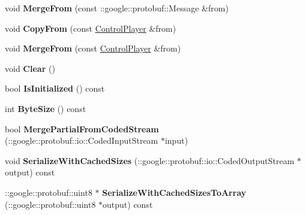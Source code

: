 \begin{DoxyCompactItemize}
\item 
\hypertarget{class_control_player_ae2e6bf23c72d1c1fafdb4069a0c85616}{void {\bfseries Merge\-From} (const \-::google\-::protobuf\-::\-Message \&from)}\label{class_control_player_ae2e6bf23c72d1c1fafdb4069a0c85616}

\item 
\hypertarget{class_control_player_a3c2ca9aebf93722e016221c52b733e3b}{void {\bfseries Copy\-From} (const \hyperlink{class_control_player}{Control\-Player} \&from)}\label{class_control_player_a3c2ca9aebf93722e016221c52b733e3b}

\item 
\hypertarget{class_control_player_a7c875ed4b63747d865fb668b50ef7b50}{void {\bfseries Merge\-From} (const \hyperlink{class_control_player}{Control\-Player} \&from)}\label{class_control_player_a7c875ed4b63747d865fb668b50ef7b50}

\item 
\hypertarget{class_control_player_a691b54dd8fd3532aa7cb76b84ed85cd5}{void {\bfseries Clear} ()}\label{class_control_player_a691b54dd8fd3532aa7cb76b84ed85cd5}

\item 
\hypertarget{class_control_player_af517c65f7b59b1c11135d462d3df655c}{bool {\bfseries Is\-Initialized} () const }\label{class_control_player_af517c65f7b59b1c11135d462d3df655c}

\item 
\hypertarget{class_control_player_a67b9268037ffaa3b2403fe0539069a4f}{int {\bfseries Byte\-Size} () const }\label{class_control_player_a67b9268037ffaa3b2403fe0539069a4f}

\item 
\hypertarget{class_control_player_adc67bdb8e86fdd28c772e3291218e81b}{bool {\bfseries Merge\-Partial\-From\-Coded\-Stream} (\-::google\-::protobuf\-::io\-::\-Coded\-Input\-Stream $\ast$input)}\label{class_control_player_adc67bdb8e86fdd28c772e3291218e81b}

\item 
\hypertarget{class_control_player_a3f100d88daae100fdbae3ee409fd2359}{void {\bfseries Serialize\-With\-Cached\-Sizes} (\-::google\-::protobuf\-::io\-::\-Coded\-Output\-Stream $\ast$output) const }\label{class_control_player_a3f100d88daae100fdbae3ee409fd2359}

\item 
\hypertarget{class_control_player_a95c6688447829b02a72265eabe54abdb}{\-::google\-::protobuf\-::uint8 $\ast$ {\bfseries Serialize\-With\-Cached\-Sizes\-To\-Array} (\-::google\-::protobuf\-::uint8 $\ast$output) const }\label{class_control_player_a95c6688447829b02a72265eabe54abdb}


\end{DoxyCompactItemize}
